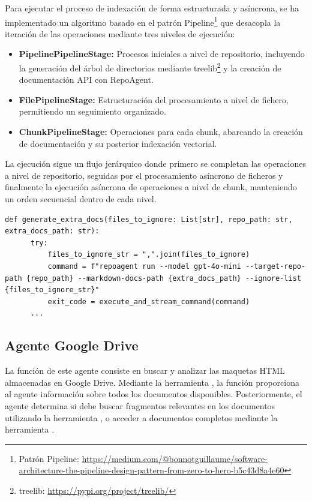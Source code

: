 Para ejecutar el proceso de indexación de forma estructurada y asíncrona, se ha implementado un algoritmo basado en el patrón Pipeline\footnote{Patrón Pipeline: \url{https://medium.com/@bonnotguillaume/software-architecture-the-pipeline-design-pattern-from-zero-to-hero-b5c43d8a4e60}} que desacopla la iteración de las operaciones mediante tres niveles de ejecución:
\begin{itemize}
\item\textbf{PipelinePipelineStage:} Procesos iniciales a nivel de repositorio, incluyendo la generación del árbol de directorios mediante treelib\footnote{treelib: \url{https://pypi.org/project/treelib/}} y la creación de documentación API con RepoAgent.
\item\textbf{FilePipelineStage:} Estructuración del procesamiento a nivel de fichero, permitiendo un seguimiento organizado.
\item\textbf{ChunkPipelineStage:} Operaciones para cada chunk, abarcando la creación de documentación y su posterior indexación vectorial.
\end{itemize}
La ejecución sigue un flujo jerárquico donde primero se completan las operaciones a nivel de repositorio, seguidas por el procesamiento asíncrono de ficheros y finalmente la ejecución asíncrona de operaciones a nivel de chunk, manteniendo un orden secuencial dentro de cada nivel.

\begin{lstlisting}[caption={\protect\opus{generate_extra_docs}: Ejecución de agente RepoAgent para crear la documentación API}, label={lst:repoagent}]
  def generate_extra_docs(files_to_ignore: List[str], repo_path: str, extra_docs_path: str):
      try:
          files_to_ignore_str = ",".join(files_to_ignore)
          command = f"repoagent run --model gpt-4o-mini --target-repo-path {repo_path} --markdown-docs-path {extra_docs_path} --ignore-list {files_to_ignore_str}"
          exit_code = execute_and_stream_command(command)
      ...
\end{lstlisting}

\subsection{Agente Google Drive}
La función de este agente consiste en buscar y analizar las maquetas HTML almacenadas en Google Drive. Mediante la herramienta , la función  proporciona al agente información sobre todos los documentos disponibles. Posteriormente, el agente determina si debe buscar fragmentos relevantes en los documentos utilizando la herramienta , o acceder a documentos completos mediante la herramienta .

